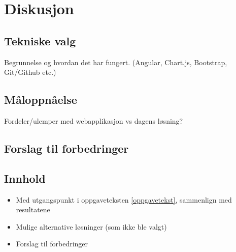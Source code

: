 \chapter{Diskusjon}
\label{diskusjon} %
\section{Tekniske valg}
Begrunnelse og hvordan det har fungert. (Angular, Chart.js, Bootstrap, Git/Github etc.)

\section{Måloppnåelse}
Fordeler/ulemper med webapplikasjon vs dagens løsning?

\section{Forslag til forbedringer}

\section{Innhold}
\begin{itemize}
    \item Med utgangspunkt i oppgaveteksten \ref{oppgavetekst}, sammenlign med resultatene
    \item Mulige alternative løsninger (som ikke ble valgt)
    \item Forslag til forbedringer
\end{itemize}





